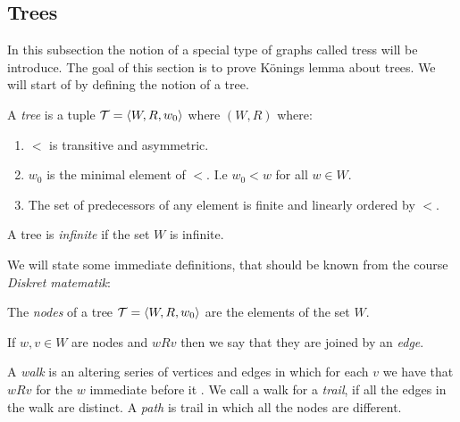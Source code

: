\documentclass[../main.tex]{subfiles}
\begin{document}
\subsection{Trees}
In this subsection the notion of a special type of graphs called tress will be
introduce. The goal of this section is to prove Könings lemma about trees. We
will start of by defining the notion of a tree.
\begin{defi}
	A \textit{tree} is a tuple $\mathcal{T}=\langle W,R,w_0\rangle$ where $(W,R)$ where:
	\begin{enumerate}
		\item $<$ is transitive and asymmetric.
		\item $w_0$ is the minimal element of $<$. I.e $w_0
			<w$ for all $w\in W$.
		\item The set of predecessors of any element is finite and
			linearly ordered by $<$.
	\end{enumerate}
	A tree is \textit{infinite} if the set $W$ is infinite.
\end{defi}

We will state some immediate definitions, that should be known from the course
\textit{Diskret matematik}:
\begin{defi}
	The \textit{nodes} of a tree $\mathcal{T}=\langle W,R,w_0\rangle$ are the
	elements of the set $W$.

	If $w,v\in W$ are nodes and  $wRv$ then we say that they are joined  by an \textit{edge}.


	A \textit{walk} is an altering series of vertices and edges in
	which for each $v$ we have that $wRv$ for the $w$ immediate before it 
	. We call a walk for a \textit{trail}, if all the edges in
	the walk are distinct. A \textit{path} is trail in which all the
	nodes are different.
\end{defi}
\end{document}
